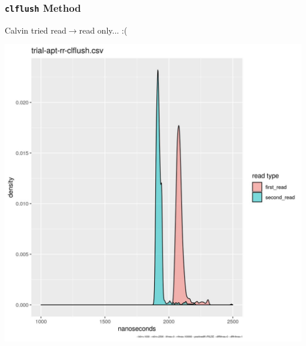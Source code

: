 \documentclass{beamer}
\begin{document}
\begin{frame}
 \frametitle{\texttt{clflush} Method}
 Calvin tried read$\rightarrow$read only... :(

 \vspace{10pt}
 \centering
 \includegraphics[height=\textheight - 20mm]{trial-apt-clflush-rr.jpg}

\end{frame}
\end{document}
